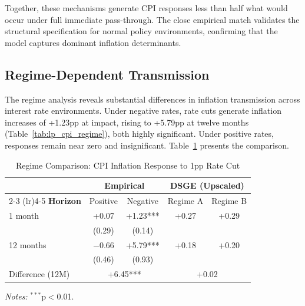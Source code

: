 \documentclass[12pt,a4paper]{article}
\begin{document}
Together, these mechanisms generate CPI responses less than half what would occur under full immediate pass-through. The close empirical match validates the structural specification for normal policy environments, confirming that the model captures dominant inflation determinants.

\subsection{Regime-Dependent Transmission}
\label{subsec:regime_discussion}

The regime analysis reveals substantial differences in inflation transmission across interest rate environments. Under negative rates, rate cuts generate inflation increases of +1.23pp at impact, rising to +5.79pp at twelve months (Table~\ref{tab:lp_cpi_regime}), both highly significant. Under positive rates, responses remain near zero and insignificant. Table~\ref{tab:regime_comparison} presents the comparison.

\begin{table}[H]
	\centering
	\caption{Regime Comparison: CPI Inflation Response to 1pp Rate Cut}
	\label{tab:regime_comparison}
	\small
	\begin{threeparttable}
		\begin{tabular}{@{}lcccc@{}}
			\toprule
			& \multicolumn{2}{c}{\textbf{Empirical}} & \multicolumn{2}{c}{\textbf{DSGE (Upscaled)}} \\
			\cmidrule(lr){2-3} \cmidrule(lr){4-5}
			\textbf{Horizon} & Positive & Negative & Regime A & Regime B \\
			\midrule
			1 month & +0.07 & +1.23*** & +0.27 & +0.29 \\
			& (0.29) & (0.14) & & \\
			12 months & $-$0.66 & +5.79*** & +0.18 & +0.20 \\
			& (0.46) & (0.93) & & \\
			\midrule
			Difference (12M) & \multicolumn{2}{c}{+6.45***} & \multicolumn{2}{c}{+0.02} \\
			\bottomrule
		\end{tabular}
		\begin{tablenotes}
			\footnotesize
			\item \textit{Notes:} $^{***}$p$<$0.01.
		\end{tablenotes}
	\end{threeparttable}
\end{table}
\end{document}
